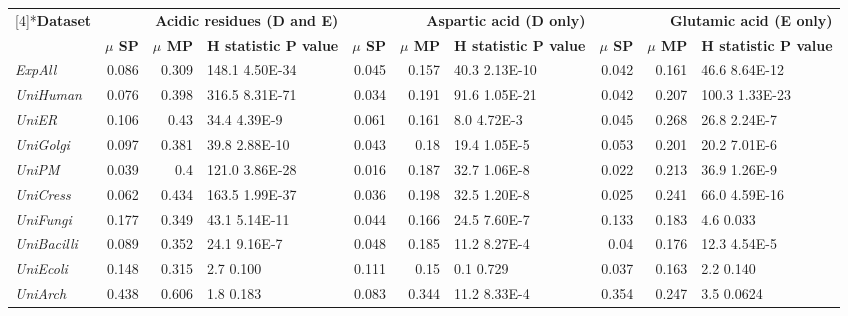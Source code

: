 \begin{table}[htbp]
{\begin{tabular}{|p{5em}|r|r|p{5em}|r|r|p{5em}|r|r|p{5em}|}
    \toprule
    \footnotesize
    \multirow{2}[4]{*}{\textbf{Dataset}} & \multicolumn{3}{p{15em}|}{\textbf{Acidic residues (D and E)}} & \multicolumn{3}{p{15em}|}{\textbf{Aspartic acid (D only)}} & \multicolumn{3}{p{15em}|}{\textbf{Glutamic acid (E only)}} \\
\cmidrule{2-10}    \multicolumn{1}{|l|}{} & \multicolumn{1}{p{5em}|}{\textbf{$\mu$ SP}} & \multicolumn{1}{p{5em}|}{\textbf{$\mu$ MP}} & \textbf{H statistic P value} & \multicolumn{1}{p{5em}|}{\textbf{$\mu$ SP}} & \multicolumn{1}{p{5em}|}{\textbf{$\mu$ MP}} & \textbf{H statistic P value} & \multicolumn{1}{p{5em}|}{\textbf{$\mu$ SP}} & \multicolumn{1}{p{5em}|}{\textbf{$\mu$ MP}} & \textbf{H statistic P value} \\
    \midrule
    \textit{ExpAll} & 0.086 & 0.309 & 148.1 4.50E-34 & 0.045 & 0.157 & 40.3 2.13E-10 & 0.042 & 0.161 & 46.6 8.64E-12 \\
    \midrule
    \textit{UniHuman} & 0.076 & 0.398 & 316.5 8.31E-71 & 0.034 & 0.191 & 91.6 1.05E-21 & 0.042 & 0.207 & 100.3 1.33E-23 \\
    \midrule
    \textit{UniER} & 0.106 & 0.43  & 34.4 4.39E-9 & 0.061 & 0.161 & 8.0 4.72E-3 & 0.045 & 0.268 & 26.8 2.24E-7 \\
    \midrule
    \textit{UniGolgi} & 0.097 & 0.381 & 39.8 2.88E-10 & 0.043 & 0.18  & 19.4 1.05E-5 & 0.053 & 0.201 & 20.2 7.01E-6 \\
    \midrule
    \textit{UniPM} & 0.039 & 0.4   & 121.0 3.86E-28 & 0.016 & 0.187 & 32.7 1.06E-8 & 0.022 & 0.213 & 36.9 1.26E-9 \\
    \midrule
    \textit{UniCress} & 0.062 & 0.434 & 163.5 1.99E-37 & 0.036 & 0.198 & 32.5 1.20E-8 & 0.025 & 0.241 & 66.0 4.59E-16 \\
    \midrule
    \textit{UniFungi} & 0.177 & 0.349 & 43.1 5.14E-11 & 0.044 & 0.166 & 24.5 7.60E-7 & 0.133 & 0.183 & 4.6 0.033 \\
    \midrule
    \textit{UniBacilli} & 0.089 & 0.352 & 24.1 9.16E-7 & 0.048 & 0.185 & 11.2 8.27E-4 & 0.04  & 0.176 & 12.3 4.54E-5 \\
    \midrule
    \textit{UniEcoli} & 0.148 & 0.315 & 2.7 0.100 & 0.111 & 0.15  & 0.1 0.729 & 0.037 & 0.163 & 2.2 0.140 \\
    \midrule
    \textit{UniArch} & 0.438 & 0.606 & 1.8 0.183 & 0.083 & 0.344 & 11.2 8.33E-4 & 0.354 & 0.247 & 3.5 0.0624 \\
    \bottomrule
   \end{tabular}}%
  \label{tab:addlabel}%
\end{table}%

